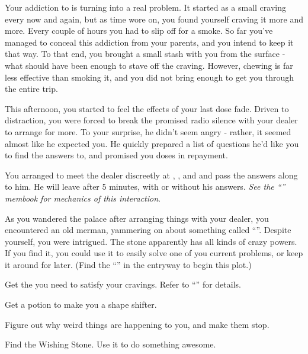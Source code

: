\documentclass[char]{NeptuneBall}
\begin{document}
Your addiction to \iDrug{} is turning into a real problem. It started as a small craving every now and again, but as time wore on, you found yourself craving it more and more. Every couple of hours you had to slip off for a smoke. So far you've managed to conceal this addiction from your parents, and you intend to keep it that way. To that end, you brought a small stash with you from the surface - what should have been enough to stave off the craving. However, chewing \iDrug{} is far less effective than smoking it, and you did not bring enough to get you through the entire trip. 

This afternoon, you started to feel the effects of your last dose fade. Driven to distraction, you were forced to break the promised radio silence with your dealer to arrange for more. To your surprise, he didn't seem angry - rather, it seemed almost like he expected you. He quickly prepared a list of questions he'd like you to find the answers to, and promised you doses in repayment.

You arranged to meet the dealer discreetly at \cTFifteen{\MYname{}}, \cTOneFifteen{\MYname{}}, \cTTwoFifteen{\MYname{}} and \cTThreeFifteen{\MYname{}} and pass the answers along to him. He will leave after 5 minutes, with or without his answers. \emph{See the ``\mSpyBook{}'' membook for mechanics of this interaction}.

As you wandered the palace after arranging things with your dealer, you encountered an old merman, yammering on about something called ``\iWishingStone{\MYname}''. Despite yourself, you were intrigued. The stone apparently has all kinds of crazy powers. If you find it, you could use it to easily solve one of you current problems, or keep it around for later. (Find the ``\sOldMan{}'' in the entryway to begin this plot.)

\begin{itemz}[Goals]
  \item Get the \iDrug{} you need to satisfy your cravings. Refer to ``\gAddicted{}'' for details.
  \item Get a potion to make you a shape shifter.
	\item Figure out why weird things are happening to you, and make them stop.
	\item Find the Wishing Stone. Use it to do something awesome.
\end{itemz}
\end{document}
